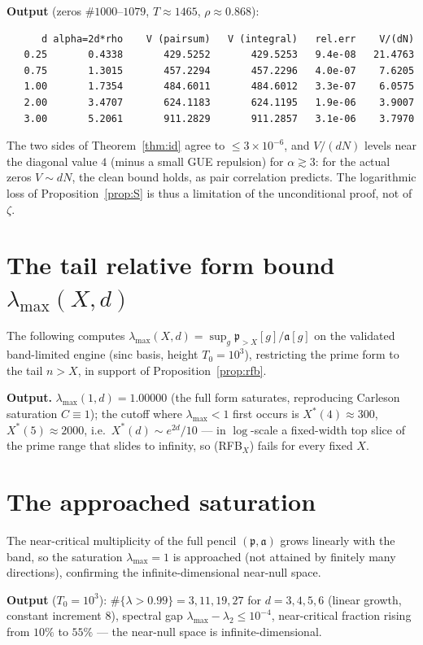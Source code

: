 \documentclass[11pt]{amsart}
\theoremstyle{definition}
\theoremstyle{remark}
\newcommand{\fa}{\mathfrak a}
\newcommand{\fp}{\mathfrak p}
\begin{document}
\medskip\noindent\textbf{Output} (zeros $\#1000$--$1079$, $T\approx1465$,
$\rho\approx0.868$):
\begin{lstlisting}
      d alpha=2d*rho    V (pairsum)   V (integral)   rel.err    V/(dN)
   0.25       0.4338       429.5252       429.5253   9.4e-08   21.4763
   0.75       1.3015       457.2294       457.2296   4.0e-07    7.6205
   1.00       1.7354       484.6011       484.6012   3.3e-07    6.0575
   2.00       3.4707       624.1183       624.1195   1.9e-06    3.9007
   3.00       5.2061       911.2829       911.2857   3.1e-06    3.7970
\end{lstlisting}
The two sides of Theorem~\ref{thm:id} agree to $\le3\times10^{-6}$, and
$V/(dN)$ levels near the diagonal value $4$ (minus a small GUE repulsion) for
$\alpha\gtrsim3$: for the actual zeros $V\sim dN$, the clean bound holds, as
pair correlation predicts. The logarithmic loss of Proposition~\ref{prop:S} is
thus a limitation of the unconditional proof, not of $\zeta$.

\section{The tail relative form bound \texorpdfstring{$\lambda_{\max}(X,d)$}{lambdamax}}\label{app:rfb}
The following computes $\lambda_{\max}(X,d)=\sup_g\fp_{>X}[g]/\fa[g]$ on the
validated band-limited engine (sinc basis, height $T_0=10^3$), restricting the
prime form to the tail $n>X$, in support of Proposition~\ref{prop:rfb}.

\noindent\textbf{Output.} $\lambda_{\max}(1,d)=1.00000$ (the full form saturates,
reproducing Carleson saturation $C\equiv1$); the cutoff where $\lambda_{\max}<1$
first occurs is $X^\ast(4)\approx300$, $X^\ast(5)\approx2000$, i.e.\
$X^\ast(d)\sim e^{2d}/10$ --- in $\log$-scale a fixed-width top slice of the prime
range that slides to infinity, so (RFB$_X$) fails for every fixed $X$.

\section{The approached saturation}\label{app:near}
The near-critical multiplicity of the full pencil $(\fp,\fa)$ grows linearly with
the band, so the saturation $\lambda_{\max}=1$ is approached (not attained by
finitely many directions), confirming the infinite-dimensional near-null space.

\noindent\textbf{Output} ($T_0=10^3$): $\#\{\lambda>0.99\}=3,11,19,27$ for
$d=3,4,5,6$ (linear growth, constant increment $8$), spectral gap
$\lambda_{\max}-\lambda_2\le10^{-4}$, near-critical fraction rising from $10\%$ to
$55\%$ --- the near-null space is infinite-dimensional.
\end{document}
